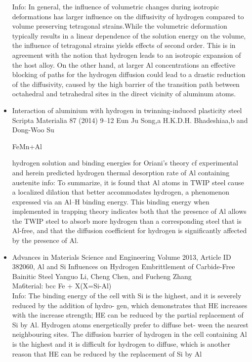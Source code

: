 \documentclass[11pt,floatfix,showpacs]{amsart}
\begin{document}
\begin{itemize}
Info: In general, the influence of volumetric changes during isotropic deformations has larger influence on the diffusivity of hydrogen compared to volume preserving tetragonal strains.While the volumetric deformation typically results in a linear dependence of the solution energy on the volume, the influence of tetragonal strains yields effects of second order.
This is in agreement with the notion that hydrogen leads to an isotropic expansion of the host alloy. On the other hand, at larger Al concentrations an effective blocking of paths for the hydrogen diffusion could lead to a drastic reduction of the diffusivity, caused by the high barrier of the transition
path between octahedral and tetrahedral sites in the direct vicinity of aluminum atoms.
\item Interaction of aluminium with hydrogen in twinning-induced
plasticity steel
Scripta Materialia 87 (2014) 9–12
Eun Ju Song,a H.K.D.H. Bhadeshiaa,b and Dong-Woo Su

FeMn+Al 

hydrogen solution and binding energies for Oriani's theory
cf experimental and herein predicted hydrogen thermal desorption rate of Al containing austenite
info:
To summarize, it is found that Al atoms in TWIP steel cause a localized dilation that better accommodates hydrogen, a phenomenon expressed via an Al–H binding
energy. This binding energy when implemented in trapping theory indicates both that the presence of Al allows the TWIP steel to absorb more hydrogen than a corresponding steel that is Al-free, and that the diffusion coefficient for hydrogen is significantly affected by the presence of Al.

\item Advances in Materials Science and Engineering Volume 2013, Article ID 382060, Al and Si Influences on Hydrogen Embrittlement of Carbide-Free Bainitic Steel
Yanguo Li, Cheng Chen, and Fucheng Zhang\\
Ma6terial: bcc Fe + X(X=Si-Al)\\
Info: The binding energy of the cell with Si is the highest, and it is severely reduced by the addition of hydro- gen, which demonstrates that HE increases with the increase strength; HE can be reduced by the partial replacement of Si by Al. Hydrogen atoms energetically prefer to diffuse bet- ween the nearest neighbouring sites. The diffusion barrier of hydrogen in the cell containing Al is the highest and it is difficult for hydrogen to diffuse, which is another reason that HE can be reduced by the replacement of Si by Al


\end{itemize}
\end{document}
